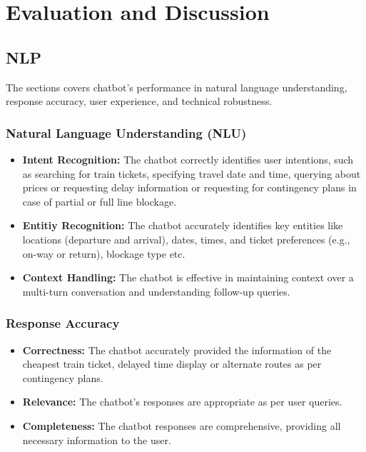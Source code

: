 \section{Evaluation and Discussion}


\subsection{NLP}
The sections covers chatbot's performance in natural language understanding, response accuracy, user experience, and technical robustness. 
\subsubsection{Natural Language Understanding (NLU)}
\begin{itemize}
    \item \textbf{Intent Recognition:} The chatbot correctly identifies user intentions, such as searching for train tickets, specifying travel date and time, querying about prices or requesting delay information or requesting for contingency plans in case of partial or full line blockage.
    \item \textbf{Entitiy Recognition:} The chatbot accurately identifies key entities like locations (departure and arrival), dates, times, and ticket preferences (e.g., on-way or return), blockage type etc.
    \item \textbf{Context Handling:} The chatbot is effective in maintaining context over a multi-turn conversation and understanding follow-up queries.
\end{itemize} 

\subsubsection{Response Accuracy}
\begin{itemize}
    \item \textbf{Correctness:} The chatbot accurately provided the information of the cheapest train ticket, delayed time display or alternate routes as per contingency plans.
    \item \textbf{Relevance:} The chatbot's responses are appropriate as per user queries.
    \item \textbf{Completeness:} The chatbot responses are comprehensive, providing all necessary information to the user.
\end{itemize} 

